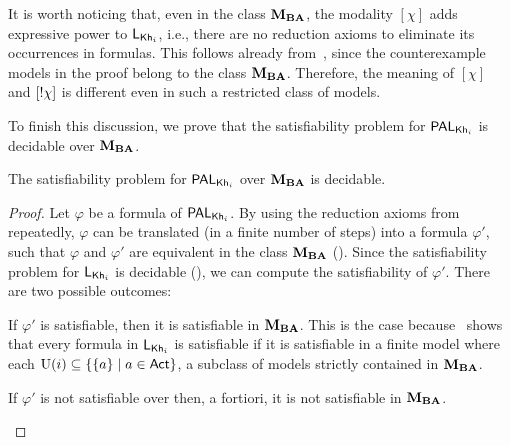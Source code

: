 It is worth noticing that, even in the class $\mathbf{M}_{\mathbf{BA}}$, the modality $[\chi]$ adds expressive power to $\mathsf{L}_{{\sf Kh}_i}$, i.e., there are no reduction axioms to eliminate its occurrences in formulas. This follows already from~, since the counterexample models in the proof belong to the class $\mathbf{M}_{\mathbf{BA}}$. Therefore, the meaning of $[\chi]$ and $[!\chi]$ is different even in such a restricted class of models.

To finish this discussion, we prove that the satisfiability problem for $\mathsf{PAL}_{{\sf Kh}_i}$ is decidable  over $\mathbf{M}_{\mathbf{BA}}$.

\medskip 

\begin{corollary}\label{cor:palsat}
The satisfiability problem for $\mathsf{PAL}_{{\sf Kh}_i}$ over $\mathbf{M}_{\mathbf{BA}}$ is decidable.
\end{corollary}
\begin{proof}
Let $\varphi$ be a formula of $\mathsf{PAL}_{{\sf Kh}_i}$. By using the reduction axioms from~ repeatedly, $\varphi$ can be translated (in a finite number of steps) into a formula $\varphi'$, such that $\varphi$ and $\varphi'$ are equivalent in the class $\mathbf{M}_{\mathbf{BA}}$ (). 
Since the satisfiability problem for $\mathsf{L}_{{\sf Kh}_i}$ is decidable (\cite{AFSVQ21,AFSVQ23report}), we can compute the satisfiability of $\varphi'$.
There are two possible outcomes:
\begin{inlineenum}
\item If $\varphi'$ is satisfiable, then it is satisfiable in $\mathbf{M}_{\mathbf{BA}}$. This is the case because~\cite{AFSVQ21,AFSVQ23report} shows that every formula in $\mathsf{L}_{{\sf Kh}_i}$ is satisfiable if it is  satisfiable in a finite model where each $\operatorname{U}(i)\subseteq\{ \{ a \} \mid a\in{\rm \sf Act} \}$, a subclass of models strictly contained in $\mathbf{M}_{\mathbf{BA}}$.  
\item If $\varphi'$ is not satisfiable over  then, a fortiori, it is not satisfiable in $\mathbf{M}_{\mathbf{BA}}$. %
\end{inlineenum}
\end{proof}
